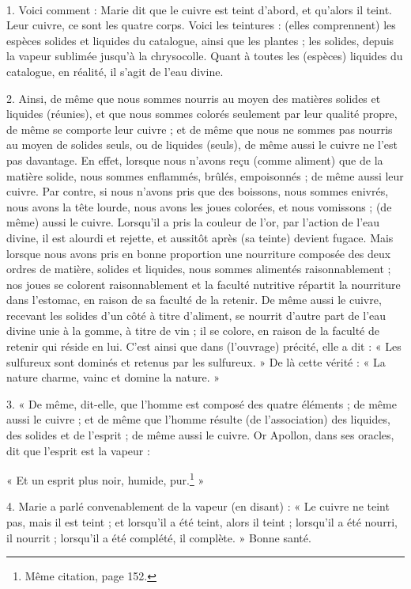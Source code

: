 \documentclass[a4paper, 11pt, oneside, polutonikogreek, french]{article}
\begin{document}
\paragraph{}
1. Voici comment : Marie dit que le cuivre est teint d'abord, et qu'alors il teint. Leur cuivre, ce sont les quatre corps. Voici les teintures : (elles comprennent) les espèces solides et liquides du catalogue, ainsi que les plantes ; les solides, depuis la vapeur sublimée jusqu'à la chrysocolle. Quant à toutes les (espèces) liquides du catalogue, en réalité, il s'agit de l'eau divine.

2. Ainsi, de même que nous sommes nourris au moyen des matières solides et liquides (réunies), et que nous sommes colorés seulement par leur qualité propre, de même se comporte leur cuivre ; et de même que nous ne sommes pas nourris au moyen de solides seuls, ou de liquides (seuls), de même aussi le cuivre ne l'est pas davantage. En effet, lorsque nous n'avons reçu (comme aliment) que de la matière solide, nous sommes enflammés, brûlés, empoisonnés ; de même aussi leur cuivre. Par contre, si nous n'avons pris que des boissons, nous sommes enivrés, nous avons la tête lourde, nous avons les joues colorées, et nous vomissons ; (de même) aussi le cuivre. Lorsqu'il a pris la couleur de l'or, par l'action de l'eau divine, il est alourdi et rejette, et aussitôt après (sa teinte) devient fugace. Mais lorsque nous avons pris en bonne proportion une nourriture composée des deux ordres de matière, solides et liquides, nous sommes alimentés raisonnablement ; nos joues se colorent raisonnablement et la faculté nutritive répartit la nourriture dans l'estomac, en raison de sa faculté de la retenir. De même aussi le cuivre, recevant les solides d'un côté à titre d'aliment, se nourrit d'autre part de l'eau divine unie à la gomme, à titre de vin ; il se colore, en raison de la faculté de retenir qui réside en lui. C'est ainsi que dans (l'ouvrage) précité, elle a dit : « Les sulfureux sont dominés et retenus par les sulfureux. » De là cette vérité : « La nature charme, vainc et domine la nature. »

3. « De même, dit-elle, que l'homme est composé des quatre éléments ; de même aussi le cuivre ; et de même que l'homme résulte (de l'association) des liquides, des solides et de l'esprit ; de même aussi le cuivre. Or Apollon, dans ses oracles, dit que l'esprit est la vapeur :

« Et un esprit plus noir, humide, pur.\footnote{Même citation, page 152.} »

4. Marie a parlé convenablement de la vapeur (en disant) : « Le cuivre ne teint pas, mais il est teint ; et lorsqu'il a été teint, alors il teint ; lorsqu'il a été nourri, il nourrit ; lorsqu'il a été complété, il complète. » Bonne santé.
\end{document}
